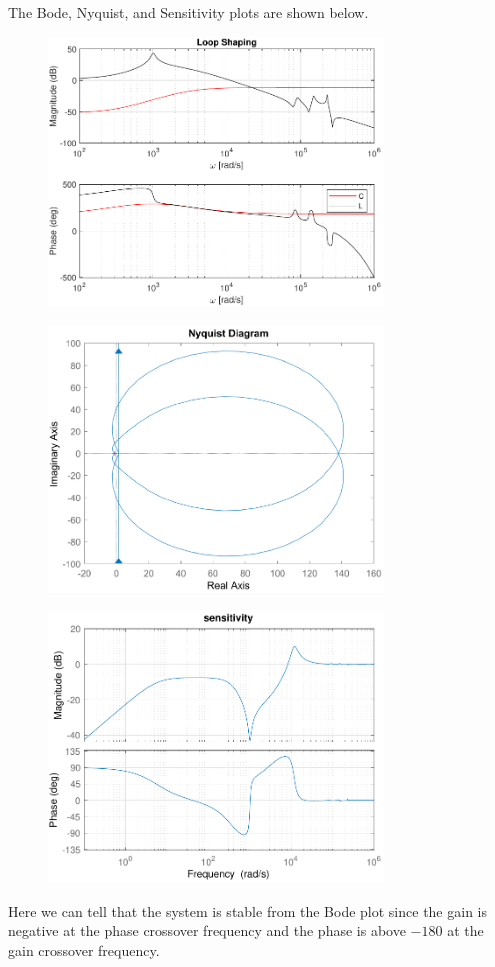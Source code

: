 \documentclass[12pt]{article}
\begin{document}
The Bode, Nyquist, and Sensitivity plots are shown below.
\begin{figure}[H]
    \begin{center}
        \includegraphics[width=3.5in]{PositionControl-Bode.pdf}
    \end{center}
\end{figure}
\begin{figure}[H]
    \begin{center}
        \includegraphics[width=3.5in]{PositionControl-Nyquist.pdf}
    \end{center}
\end{figure}
\begin{figure}[H]
    \begin{center}
        \includegraphics[width=3.5in]{PositionControl-Sensitivity.pdf}
    \end{center}
\end{figure}
Here we can tell that the system is stable from the Bode plot since the gain is negative
at the phase crossover frequency and the phase is above \(-180\) at the gain crossover
frequency.
\end{document}
